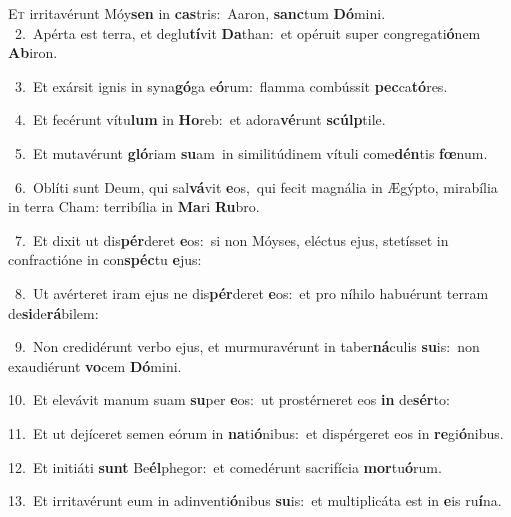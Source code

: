 \lettrine{\initial\textcolor{\initialcolor}{E}}{t} irritavérunt Móy\textbf{sen} in \textbf{cas}\-tris:~\star Aaron, \textbf{sanc}\-tum \textbf{Dó}\-mini.\\
{\numbfont\textcolor{\numbcolor}{~2.}}~Apérta est terra, et deglu\-\textbf{tí}\-vit \textbf{Da}\-than:~\star et opéruit super congregati\-\textbf{ó}\-nem \textbf{Ab}\-iron.\par
{\numbfont\textcolor{\numbcolor}{~3.}}~Et exársit ignis in syna\-\textbf{gó}\-ga e\-\textbf{ó}\-rum:~\star flamma combússit \textbf{pec}\-ca\-\textbf{tó}\-res.\par
{\numbfont\textcolor{\numbcolor}{~4.}}~Et fecérunt vítu\textbf{lum} in \textbf{Ho}\-reb:~\star et adora\-\textbf{vé}\-runt \textbf{scúlp}\-tile.\par
{\numbfont\textcolor{\numbcolor}{~5.}}~Et mutavérunt \textbf{gló}\-riam \textbf{su}\-am~\star in similitúdinem vítuli come\-\textbf{dén}\-tis \textbf{fœ}\-num.\par
{\numbfont\textcolor{\numbcolor}{~6.}}~Oblíti sunt Deum, qui sal\-\textbf{vá}\-vit \textbf{e}\-os,~\star qui fecit magnália in Ægýpto, mirabília in terra Cham: terribília in \textbf{Ma}\-ri \textbf{Ru}\-bro.\par
{\numbfont\textcolor{\numbcolor}{~7.}}~Et dixit ut dis\-\textbf{pér}\-deret \textbf{e}\-os:~\star si non Móyses, eléctus ejus, stetísset in confractióne in con\-\textbf{spéc}\-tu \textbf{e}\-jus:\par
{\numbfont\textcolor{\numbcolor}{~8.}}~Ut avérteret iram ejus ne dis\-\textbf{pér}\-deret \textbf{e}\-os:~\star et pro níhilo habuérunt terram de\-\textbf{si}\-de\-\textbf{rá}\-bilem:\par
{\numbfont\textcolor{\numbcolor}{~9.}}~Non credidérunt verbo ejus, et murmuravérunt in taber\-\textbf{ná}\-culis \textbf{su}\-is:~\star non exaudiérunt \textbf{vo}\-cem \textbf{Dó}\-mini.\par
{\numbfont\textcolor{\numbcolor}{10.}}~Et elevávit manum suam \textbf{su}\-per \textbf{e}\-os:~\star ut prostérneret eos \textbf{in} de\-\textbf{sér}\-to:\par
{\numbfont\textcolor{\numbcolor}{11.}}~Et ut dejíceret semen eórum in \textbf{na}\-ti\-\textbf{ó}\-nibus:~\star et dispérgeret eos in \textbf{re}\-gi\-\textbf{ó}\-nibus.\par
{\numbfont\textcolor{\numbcolor}{12.}}~Et initiáti \textbf{sunt} Be\-\textbf{él}\-phegor:~\star et comedérunt sacrifícia \textbf{mor}\-tu\-\textbf{ó}\-rum.\par
{\numbfont\textcolor{\numbcolor}{13.}}~Et irritavérunt eum in adinventi\-\textbf{ó}\-nibus \textbf{su}\-is:~\star et multiplicáta est in \textbf{e}\-is ru\-\textbf{í}\-na.\par
